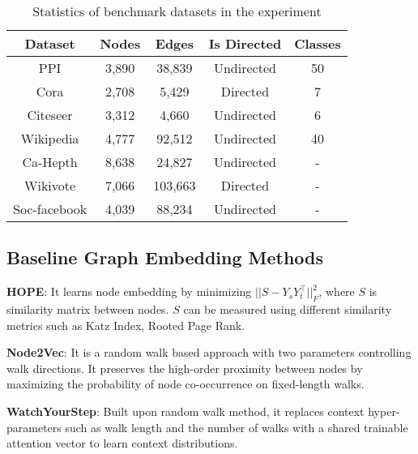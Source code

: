 \documentclass{article}
\begin{document}
\begin{table}[ht]
\caption{Statistics of benchmark datasets in the experiment}
\label{tab:datasets}
\centering
\begin{tabular}{c|c|c|c|c}
\toprule
Dataset & Nodes  & Edges & Is Directed & Classes\\
\midrule
PPI & 3,890  & 38,839 & Undirected & 50\\
Cora & 2,708  & 5,429 & Directed & 7\\
Citeseer & 3,312 & 4,660 & Undirected & 6\\
Wikipedia & 4,777 & 92,512 & Undirected & 40 \\
Ca-Hepth & 8,638 & 24,827 & Undirected & -\\
Wikivote & 7,066 & 103,663 & Directed & -\\
Soc-facebook & 4,039 & 88,234 & Undirected & -\\
\bottomrule
\end{tabular}
\end{table}

\subsection{Baseline Graph Embedding Methods}


\textbf{HOPE}: It learns node embedding by minimizing $||S - Y_sY_t^\intercal||_F^2$, where $S$ is similarity matrix between nodes. $S$ can be measured using different similarity metrics such as Katz Index, Rooted Page Rank. 

\textbf{Node2Vec}: It is a random walk based  approach with two parameters controlling walk directions. It preserves the high-order proximity between nodes by maximizing the probability of node co-occurrence on fixed-length walks. 

\textbf{WatchYourStep}: Built upon random walk method, it replaces context hyper-parameters such as walk length and the number of walks with a shared trainable attention vector to learn context distributions.
\end{document}
